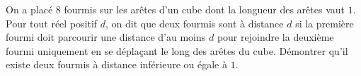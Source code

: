 On a placé $8$ fourmis sur les arêtes d'un cube dont la longueur des arêtes vaut $1$. Pour tout réel positif $d$, on dit que deux fourmis sont à distance $d$ si la première fourmi doit parcourir une distance d'au moins $d$ pour rejoindre la deuxième fourmi uniquement en se déplaçant le long des arêtes du cube. Démontrer qu'il existe deux fourmis à distance inférieure ou égale à $1$.